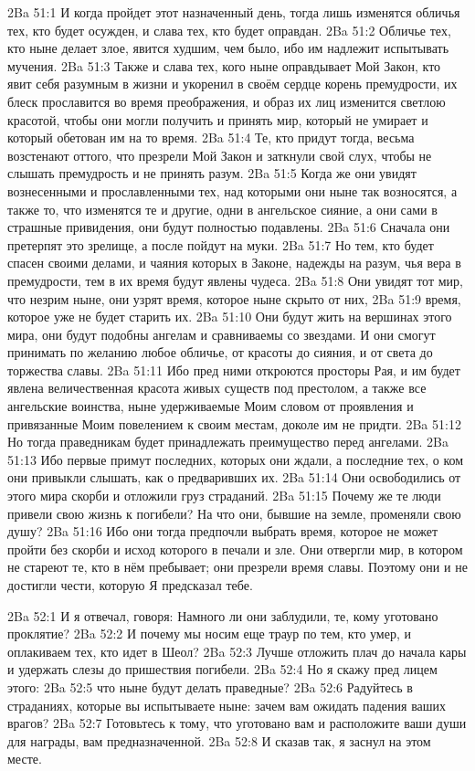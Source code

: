 \vs 2Ba 51:1
И когда пройдет этот назначенный день, тогда лишь изменятся обличья тех, кто будет осужден, и слава тех, кто будет оправдан.
\vs 2Ba 51:2
Обличье тех, кто ныне делает злое, явится худшим, чем было, ибо им надлежит испытывать мучения.
\vs 2Ba 51:3
Также и слава тех, кого ныне оправдывает Мой Закон, кто явит себя разумным в жизни и укоренил в своём сердце корень премудрости, их блеск прославится во время преображения, и образ их лиц изменится светлою красотой, чтобы они могли получить и принять мир, который не умирает и который обетован им на то время.
\vs 2Ba 51:4
Те, кто придут тогда, весьма возстенают оттого, что презрели Мой Закон и заткнули свой слух, чтобы не слышать премудрость и не принять разум.
\vs 2Ba 51:5
Когда же они увидят вознесенными и прославленными тех, над которыми они ныне так возносятся, а также то, что изменятся те и другие, одни в ангельское сияние, а они сами в страшные привидения, они будут полностью подавлены.
\vs 2Ba 51:6
Сначала они претерпят это зрелище, а после пойдут на муки.
\vs 2Ba 51:7
Но тем, кто будет спасен своими делами, и чаяния которых в Законе, надежды на разум, чья вера в премудрости, тем в их время будут явлены чудеса.
\vs 2Ba 51:8
Они увидят тот мир, что незрим ныне, они узрят время, которое ныне скрыто от них,
\vs 2Ba 51:9
время, которое уже не будет старить их.
\vs 2Ba 51:10
Они будут жить на вершинах этого мира, они будут подобны ангелам и сравниваемы со звездами. И они смогут принимать по желанию любое обличье, от красоты до сияния, и от света до торжества славы.
\vs 2Ba 51:11
Ибо пред ними откроются просторы Рая, и им будет явлена величественная красота живых существ под престолом, а также все ангельские воинства, ныне удерживаемые Моим словом от проявления и привязанные Моим повелением к своим местам, доколе им не придти.
\vs 2Ba 51:12
Но тогда праведникам будет принадлежать преимущество перед ангелами.
\vs 2Ba 51:13
Ибо первые примут последних, которых они ждали, а последние тех, о ком они привыкли слышать, как о предваривших их.
\vs 2Ba 51:14
Они освободились от этого мира скорби и отложили груз страданий.
\vs 2Ba 51:15
Почему же те люди привели свою жизнь к погибели? На что они, бывшие на земле, променяли свою душу?
\vs 2Ba 51:16
Ибо они тогда предпочли выбрать время, которое не может пройти без скорби и исход которого в печали и зле. Они отвергли мир, в котором не стареют те, кто в нём пребывает; они презрели время славы. Поэтому они и не достигли чести, которую Я предсказал тебе.

\vs 2Ba 52:1
И я отвечал, говоря: Намного ли они заблудили, те, кому уготовано проклятие?
\vs 2Ba 52:2
И почему мы носим еще траур по тем, кто умер, и оплакиваем тех, кто идет в Шеол?
\vs 2Ba 52:3
Лучше отложить плач до начала кары и удержать слезы до пришествия погибели.
\vs 2Ba 52:4
Но я скажу пред лицем этого:
\vs 2Ba 52:5
что ныне будут делать праведные?
\vs 2Ba 52:6
Радуйтесь в страданиях, которые вы испытываете ныне: зачем вам ожидать падения ваших врагов?
\vs 2Ba 52:7
Готовьтесь к тому, что уготовано вам и расположите ваши души для награды, вам предназначенной.
\vs 2Ba 52:8
И сказав так, я заснул на этом месте.

